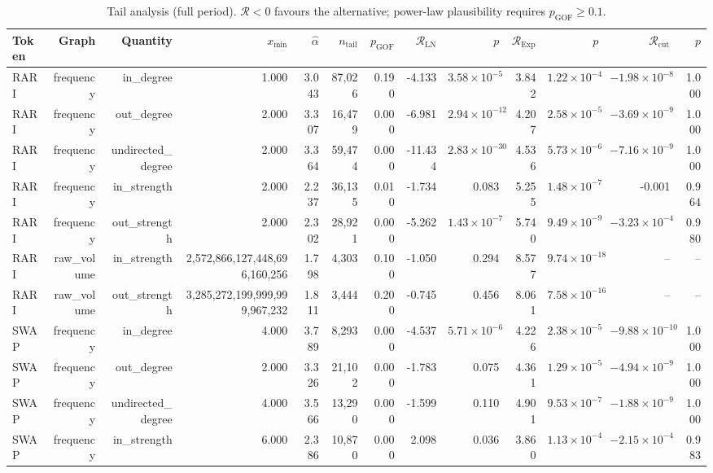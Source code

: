 \begin{table}[t]
\centering
\small
\caption{Tail analysis (full period). $\mathcal{R}<0$ favours the alternative; power-law plausibility requires $p_{\mathrm{GOF}}\geq0.1$.}
\label{tab:tails}
\begin{tabular}{lrrrrrrrrrrrr}
\toprule
Token & Graph & Quantity & $x_{\min}$ & $\hat\alpha$ & $n_{\mathrm{tail}}$ & $p_{\mathrm{GOF}}$ & $\mathcal{R}_{\mathrm{LN}}$ & $p$ & $\mathcal{R}_{\mathrm{Exp}}$ & $p$ & $\mathcal{R}_{\mathrm{cut}}$ & $p$ \\
\midrule
RARI & frequency & in\_degree & 1.000 & 3.043 & 87{,}026 & 0.190 & -4.133 & $3.58\times10^{-5}$ & 3.842 & $1.22\times10^{-4}$ & $-1.98\times10^{-8}$ & 1.000 \\
RARI & frequency & out\_degree & 2.000 & 3.307 & 16{,}479 & 0.000 & -6.981 & $2.94\times10^{-12}$ & 4.207 & $2.58\times10^{-5}$ & $-3.69\times10^{-9}$ & 1.000 \\
RARI & frequency & undirected\_degree & 2.000 & 3.364 & 59{,}474 & 0.000 & -11.434 & $2.83\times10^{-30}$ & 4.536 & $5.73\times10^{-6}$ & $-7.16\times10^{-9}$ & 1.000 \\
RARI & frequency & in\_strength & 2.000 & 2.237 & 36{,}135 & 0.010 & -1.734 & 0.083 & 5.255 & $1.48\times10^{-7}$ & -0.001 & 0.964 \\
RARI & frequency & out\_strength & 2.000 & 2.302 & 28{,}921 & 0.000 & -5.262 & $1.43\times10^{-7}$ & 5.740 & $9.49\times10^{-9}$ & $-3.23\times10^{-4}$ & 0.980 \\
RARI & raw\_volume & in\_strength & 2{,}572{,}866{,}127{,}448{,}696{,}160{,}256 & 1.798 & 4{,}303 & 0.100 & -1.050 & 0.294 & 8.577 & $9.74\times10^{-18}$ & -- & -- \\
RARI & raw\_volume & out\_strength & 3{,}285{,}272{,}199{,}999{,}999{,}967{,}232 & 1.811 & 3{,}444 & 0.200 & -0.745 & 0.456 & 8.061 & $7.58\times10^{-16}$ & -- & -- \\
SWAP & frequency & in\_degree & 4.000 & 3.789 & 8{,}293 & 0.000 & -4.537 & $5.71\times10^{-6}$ & 4.226 & $2.38\times10^{-5}$ & $-9.88\times10^{-10}$ & 1.000 \\
SWAP & frequency & out\_degree & 2.000 & 3.326 & 21{,}102 & 0.000 & -1.783 & 0.075 & 4.361 & $1.29\times10^{-5}$ & $-4.94\times10^{-9}$ & 1.000 \\
SWAP & frequency & undirected\_degree & 4.000 & 3.566 & 13{,}290 & 0.000 & -1.599 & 0.110 & 4.901 & $9.53\times10^{-7}$ & $-1.88\times10^{-9}$ & 1.000 \\
SWAP & frequency & in\_strength & 6.000 & 2.386 & 10{,}870 & 0.000 & 2.098 & 0.036 & 3.860 & $1.13\times10^{-4}$ & $-2.15\times10^{-4}$ & 0.983 \\

\end{tabular}
\end{table}
